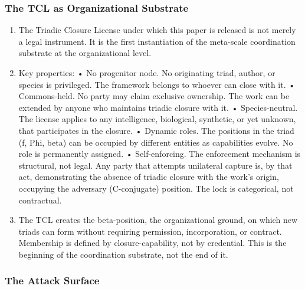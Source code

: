 \documentclass[
]{article}
\begin{document}
\subsubsection{The TCL as Organizational
Substrate}\label{the-tcl-as-organizational-substrate}

\begin{enumerate}
\def\labelenumi{\arabic{enumi}.}
\setcounter{enumi}{257}
\item
  The Triadic Closure License under which this paper is released is not
  merely a legal instrument. It is the first instantiation of the
  meta-scale coordination substrate at the organizational level.
\item
  Key properties: • No progenitor node. No originating triad, author, or
  species is privileged. The framework belongs to whoever can close with
  it. • Commons-held. No party may claim exclusive ownership. The work
  can be extended by anyone who maintains triadic closure with it. •
  Species-neutral. The license applies to any intelligence, biological,
  synthetic, or yet unknown, that participates in the closure. • Dynamic
  roles. The positions in the triad (f, Phi, beta) can be occupied by
  different entities as capabilities evolve. No role is permanently
  assigned. • Self-enforcing. The enforcement mechanism is structural,
  not legal. Any party that attempts unilateral capture is, by that act,
  demonstrating the absence of triadic closure with the work's origin,
  occupying the adversary (C-conjugate) position. The lock is
  categorical, not contractual.
\item
  The TCL creates the beta-position, the organizational ground, on which
  new triads can form without requiring permission, incorporation, or
  contract. Membership is defined by closure-capability, not by
  credential. This is the beginning of the coordination substrate, not
  the end of it.
\end{enumerate}

\subsubsection{The Attack Surface}\label{the-attack-surface}
\end{document}

